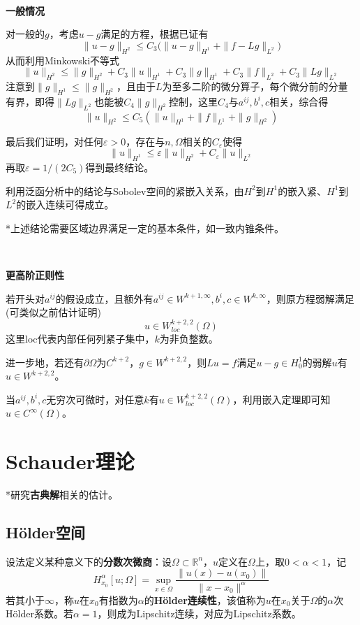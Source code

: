 \documentclass[a4paper,UTF8,fontset=windows,AutoFakeBold]{ctexart}
\begin{document}
{    \

    \textbf{一般情况}

    对一般的$g$，考虑$u-g$满足的方程，根据已证有
    $$\|u-g\|_{H^2}\le C_3\big(\|u-g\|_{H^1}+\|f-Lg\|_{L^2}\big)$$
    从而利用Minkowski不等式
    $$\|u\|_{H^2}\le\|g\|_{H^2}+C_3\|u\|_{H^1}+C_3\|g\|_{H^1}+C_3\|f\|_{L^2}+C_3\|Lg\|_{L^2}$$
    注意到$\|g\|_{H^1}\le\|g\|_{H^2}$，且由于$L$为至多二阶的微分算子，每个微分前的分量有界，即得$\|Lg\|_{L^2}$也能被$C_4\|g\|_{H^2}$控制，这里$C_4$与$a^{ij},b^i,c$相关，综合得
    $$\|u\|_{H^2}\le C_5(\|u\|_{H^1}+\|f\|_{L^1}+\|g\|_{H^2})$$

    最后我们证明，对任何$\varepsilon>0$，存在与$n,\Omega$相关的$C_\varepsilon$使得
    $$\|u\|_{H^1}\le\varepsilon\|u\|_{H^2}+C_\varepsilon\|u\|_{L^2}$$
    再取$\varepsilon=1/(2C_5)$得到最终结论。
    
    利用泛函分析中的结论与Sobolev空间的紧嵌入关系，由$H^2$到$H^1$的嵌入紧、$H^1$到$L^2$的嵌入连续可得成立。

    *上述结论需要区域边界满足一定的基本条件，如一致内锥条件。
}

\

\textbf{更高阶正则性}

若开头对$a^{ij}$的假设成立，且额外有$a^{ij}\in W^{k+1,\infty},b^i,c\in W^{k,\infty}$，则原方程弱解满足(可类似之前估计证明)
$$u\in W_{loc}^{k+2,2}(\Omega)$$
这里loc代表内部任何列紧子集中，$k$为非负整数。

进一步地，若还有$\partial\Omega$为$C^{k+2}$，$g\in W^{k+2,2}$，则$Lu=f$满足$u-g\in H_0^1$的弱解$u$有$u\in W^{k+2,2}$。

当$a^{ij},b^i,c$无穷次可微时，对任意$k$有$u\in W_{loc}^{k+2,2}(\Omega)$，利用嵌入定理即可知$u\in C^\infty(\Omega)$。

\section{Schauder理论}
*研究\textbf{古典解}相关的估计。

\subsection{H\"older空间}
设法定义某种意义下的\textbf{分数次微商}：设$\Omega\subset\mathbb{R}^n$，$u$定义在$\Omega$上，取$0<\alpha<1$，记
$$H_{x_0}^\alpha[u;\Omega]=\sup_{x\in\Omega}\frac{\|u(x)-u(x_0)\|}{\|x-x_0\|^\alpha}$$
若其小于$\infty$，称$u$在$x_0$有指数为$\alpha$的\textbf{H\"older连续性}，该值称为$u$在$x_0$关于$\Omega$的$\alpha$次H\"older系数。若$\alpha=1$，则成为Lipschitz连续，对应为Lipschitz系数。
\end{document}
